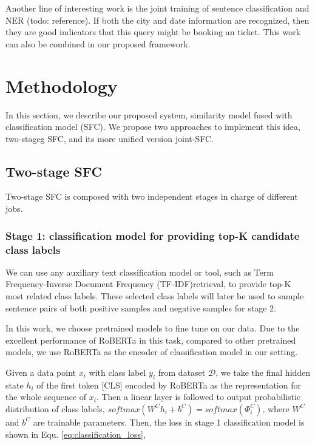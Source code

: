 \documentclass[letterpaper]{article} %
\begin{document}
  Another   line   of  interesting  work  is  the  joint  training  of  sentence
  classification   and  NER  (todo:  reference).  If  both  the  city  and  date
  information  are  recognized,  then  they  are good indicators that this query
  might  be  booking  an  ticket. This work can also be combined in our proposed
  framework.

  \section{Methodology}
  In  this section, we describe our proposed system, similarity model fused with
  classification  model (SFC). We propose two approaches to implement this idea,
  two-stageg SFC, and its more unified version joint-SFC.

  \subsection{Two-stage SFC}

  Two-stage   SFC  is  composed  with  two  independent stages  in  charge of
  different  jobs. 

  \subsubsection*{
    Stage 1: classification model for providing top-K candidate class labels
  } 
  We  can  use any auxiliary text classification model or tool,
  such as Term Frequency-Inverse Document Frequency (TF-IDF)retrieval, to
  provide  top-K  most  related  class  labels. These selected class labels will
  later  be  used to sample sentence pairs of both positive samples and negative
  samples  for  stage  2. 

  In  this  work,  we  choose pretrained models to fine tune on our data.
  Due to the excellent performance of RoBERTa in this task, compared to other pretrained
  models, we use RoBERTa as the encoder of classification model in our setting.

  Given   a   data   point   $x_{i}$  with  class  label  $y_{i}$  from  dataset
  $\mathcal{D}$, we take the final hidden state $h_{i}$ of the first token [CLS]
  encoded  by  RoBERTa  as the representation for the whole sequence of $x_{i}$.
  Then  a linear layer is followed to output probabilistic distribution of class
  labels,  $softmax(W^Ch_{i}+b^C)=softmax({\Phi}^C_{i})$,  where $W^C$ and $b^C$
  are  trainable  parameters.  Then, the loss in stage 1 classification model is
  shown in Equ. \ref{eq:classification_loss},
\end{document}

